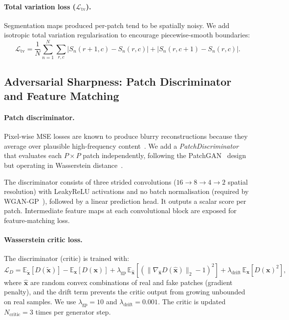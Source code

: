 \documentclass{article}
\newcommand{\EE}{\mathbb{E}}
\newcommand{\bx}{\mathbf{x}}
\begin{document}
\paragraph{Total variation loss ($\mathcal{L}_\mathrm{tv}$).}
Segmentation maps produced per-patch tend to be spatially noisy.  We add isotropic
total variation regularisation to encourage piecewise-smooth boundaries:
\begin{equation}
  \mathcal{L}_\mathrm{tv} = \frac{1}{N} \sum_{n=1}^{N}
  \sum_{r,c} \left|S_n(r\!+\!1,c) - S_n(r,c)\right|
           + \left|S_n(r,c\!+\!1) - S_n(r,c)\right|.
\end{equation}

\subsection{Adversarial Sharpness: Patch Discriminator and Feature Matching}
\label{sec:adv}

\paragraph{Patch discriminator.}
Pixel-wise MSE losses are known to produce blurry reconstructions because they
average over plausible high-frequency content~\cite{pathak2016context}.  We add
a \emph{PatchDiscriminator} that evaluates each $P \times P$ patch independently,
following the PatchGAN~\cite{isola2017image} design but operating in Wasserstein
distance~\cite{arjovsky2017wasserstein}.

The discriminator consists of three strided convolutions
($16\to 8 \to 4 \to 2$ spatial resolution) with LeakyReLU activations and no
batch normalisation (required by WGAN-GP~\cite{gulrajani2017improved}), followed
by a linear prediction head.  It outputs a scalar score per patch.  Intermediate
feature maps at each convolutional block are exposed for feature-matching loss.

\paragraph{Wasserstein critic loss.}
The discriminator (critic) is trained with:
\begin{equation}
  \mathcal{L}_D = \EE_{\tilde{\bx}}[D(\tilde{\bx})] - \EE_{\bx}[D(\bx)]
  + \lambda_\mathrm{gp}\, \EE_{\hat{\bx}}\!\left[(\|\nabla_{\hat{\bx}} D(\hat{\bx})\|_2 - 1)^2\right]
  + \lambda_\mathrm{drift}\, \EE_{\bx}[D(\bx)^2],
\end{equation}
where $\hat{\bx}$ are random convex combinations of real and fake patches
(gradient penalty), and the drift term prevents the critic output from growing
unbounded on real samples.  We use $\lambda_\mathrm{gp} = 10$ and
$\lambda_\mathrm{drift} = 0.001$.  The critic is updated $N_\mathrm{critic} = 3$
times per generator step.
\end{document}

